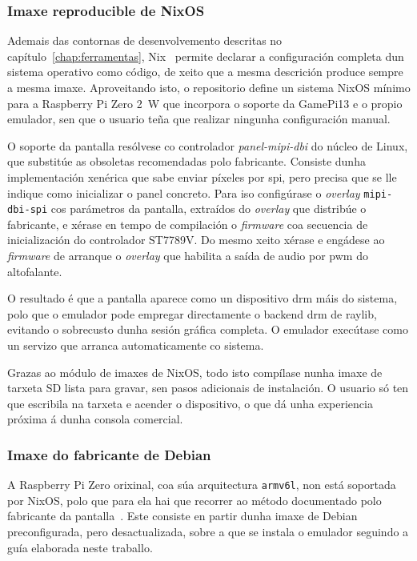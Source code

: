 \subsubsection{Imaxe reproducible de NixOS}

Ademais das contornas de desenvolvemento descritas no capítulo~\ref{chap:ferramentas}, Nix~\cite{nix} permite declarar
a configuración completa dun sistema operativo como código, de xeito que a mesma descrición produce sempre a mesma imaxe.
Aproveitando isto, o repositorio define un sistema NixOS mínimo para a Raspberry Pi Zero 2~W
que incorpora o soporte da GamePi13 e o propio emulador, sen que o usuario teña que realizar ningunha configuración manual.

O soporte da pantalla resólvese co controlador \textit{panel-mipi-dbi} do núcleo de Linux, que substitúe as
 obsoletas recomendadas polo fabricante. Consiste dunha implementación xenérica que sabe enviar píxeles por \acrshort{spi},
pero precisa que se lle indique como inicializar o panel concreto. Para iso configúrase o \textit{overlay} \texttt{mipi-dbi-spi}
cos parámetros da pantalla, extraídos do \textit{overlay} que distribúe o fabricante, e xérase en tempo de compilación
o \textit{firmware} coa secuencia de inicialización do controlador ST7789V. Do mesmo xeito xérase e engádese ao \textit{firmware}
de arranque o \textit{overlay} que habilita a saída de audio por \acrshort{pwm} do altofalante.

O resultado é que a pantalla aparece como un dispositivo \acrshort{drm} máis do sistema, polo que o emulador pode
empregar directamente o backend \acrshort{drm} de raylib, evitando o sobrecusto dunha sesión gráfica completa.
O emulador execútase como un servizo que arranca automaticamente co sistema.

Grazas ao módulo de imaxes de NixOS, todo isto compílase nunha imaxe de tarxeta SD lista para gravar,
sen pasos adicionais de instalación. O usuario só ten que escribila na tarxeta e acender o dispositivo,
o que dá unha experiencia próxima á dunha consola comercial.

\subsubsection{Imaxe do fabricante de Debian}

A Raspberry Pi Zero orixinal, coa súa arquitectura \texttt{armv6l}, non está soportada por NixOS,
polo que para ela hai que recorrer ao método documentado polo fabricante da pantalla~\cite{GamePi13}.
Este consiste en partir dunha imaxe de Debian preconfigurada, pero desactualizada, sobre a que se instala o emulador
seguindo a guía elaborada neste traballo.

